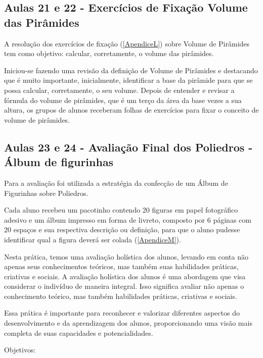 \subsection{Aulas 21 e 22 - Exercícios de Fixação Volume das Pirâmides}

A resolução dos exercícios de fixação (\autoref{ApendiceL}) sobre Volume de Pirâmides tem como objetivo: calcular, corretamente, o volume das pirâmides.

Iniciou-se fazendo uma revisão da definição de Volume de Pirâmides e destacando que é muito importante, inicialmente, identificar a base da pirâmide para que se possa calcular, corretamente, o seu volume. Depois de entender e revisar a fórmula do volume de pirâmides, que é um terço da área da base vezes a sua altura, os grupos de alunos receberam folhas de exercícios para fixar o conceito de volume de pirâmides.

\subsection{Aulas 23 e 24 - Avaliação Final dos Poliedros - Álbum de figurinhas}

Para a avaliação foi utilizada a estratégia da confecção de um Álbum de Figurinhas sobre Poliedros.

Cada aluno recebeu um pacotinho contendo 20 figuras em papel fotográfico adesivo e um álbum impresso em forma de livreto, composto por 6 páginas com 20 espaços e sua respectiva descrição ou definição, para que o aluno pudesse identificar qual a figura deverá ser colada (\autoref{ApendiceM}).

Nesta prática, temos uma avaliação holística dos alunos, levando em conta não apenas seus conhecimentos teóricos, mas também suas habilidades práticas, criativas e sociais. A avaliação holística dos alunos é uma abordagem que visa considerar o indivíduo de maneira integral. Isso significa avaliar não apenas o conhecimento teórico, mas também habilidades práticas, criativas e sociais.

Essa prática é importante para reconhecer e valorizar diferentes aspectos do desenvolvimento e da aprendizagem dos alunos, proporcionando uma visão mais completa de suas capacidades e potencialidades.

Objetivos:


